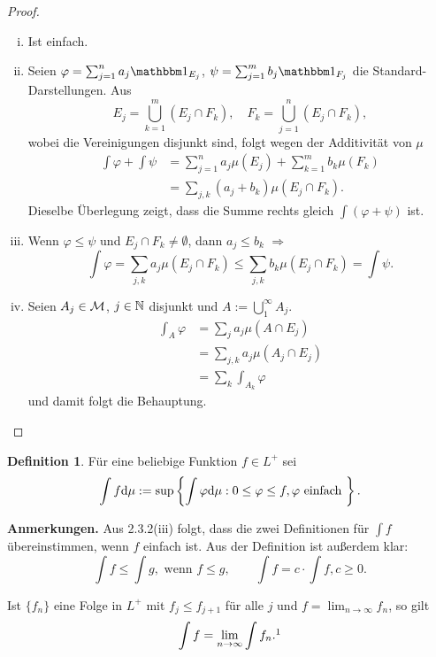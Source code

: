 \documentclass[
 a4paper,
 12pt,
 parskip=half
 ]{scrreprt}
\theoremstyle{plain}
\theoremstyle{definition}
\newtheorem{defn}[thm]{Definition}
\numberwithin{equation}{section}
\begin{document}
\begin{proof}
 \begin{enumerate}[(i)]
  \item Ist einfach.
  \item Seien $\varphi = \sum_{j=1}^n a_j \ind_{E_j}$, $\psi = \sum_{j=1}^m b_j \ind_{F_j}$ die Standard-Darstellungen. Aus 
  \[ E_j = \bigcup_{k=1}^m ( E_j \cap F_k ), \quad F_k = \bigcup_{j=1}^n ( E_j \cap F_k ), \]
  wobei die Vereinigungen disjunkt sind, folgt wegen der Additivität von $\mu$ 
  \[ \begin{aligned}
      \int \varphi + \int \psi &= \sum_{j=1}^n a_j \mu( E_j ) + \sum_{k=1}^m b_k \mu( F_k ) \\
      &= \sum_{j,k} (a_j + b_k) \mu (E_j \cap F_k ).
     \end{aligned} \]
  Dieselbe Überlegung zeigt, dass die Summe rechts gleich $\int(\varphi + \psi)$ ist.
  \item Wenn $\varphi \le \psi$ und $E_j \cap F_k \ne \emptyset$, dann $a_j \le b_k$ $\Rightarrow$
  \[ \int \varphi = \sum_{j,k} a_j \mu( E_j \cap F_k ) \le \sum_{j,k} b_k \mu (E_j \cap F_k) = \int \psi. \]
  \item Seien $A_j \in \mathcal{M}$, $j \in \mathbb{N}$ disjunkt und $A := \bigcup_1^\infty A_j$.
  \[ \begin{aligned}
      \int_A \varphi &= \sum_j a_j \mu( A \cap E_j ) \\
      &= \sum_{j,k} a_j \mu ( A_j \cap E_j ) \\
      &= \sum_k \int_{A_k} \varphi
     \end{aligned} \]
  und damit folgt die Behauptung. \qedhere
 \end{enumerate}
\end{proof}

\begin{defn}
 Für eine beliebige Funktion $f \in L^+$ sei
 \[ \int f \mathrm{d} \mu := \sup \left\{ \int \varphi \mathrm{d} \mu : 0 \le \varphi \le f, \varphi \text{ einfach } \right\}. \]
\end{defn}

\textbf{Anmerkungen.} 
Aus 2.3.2(iii) folgt, dass die zwei Definitionen für $\int f$ übereinstimmen, wenn $f$ einfach ist. Aus der Definition ist außerdem klar:
\[ \int f \le \int g, \text{ wenn } f \le g, \qquad \int f = c \cdot \int f, c \ge 0. \]

\begin{thm}
 Ist $\{f_n\}$ eine Folge in $L^+$ mit $f_j \le f_{j+1}$ für alle $j$ und $f = \lim_{n \to \infty} f_n$, so gilt
 \[ \int f = \lim_{n \to \infty} \int f_n.\footnotemark \]
\end{thm}
\end{document}
